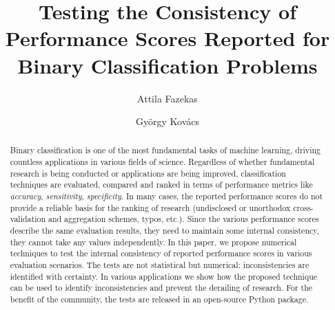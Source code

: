 \documentclass[5p, final]{elsarticle}
\begin{document}
\begin{frontmatter}




\title{Testing the Consistency of Performance Scores Reported for Binary Classification Problems}


\author[1]{Attila Fazekas} 

\author[2]{Gy\"orgy Kov\'acs}



\begin{abstract}
Binary classification is one of the most fundamental tasks of machine learning, driving countless applications in various fields of science. Regardless of whether fundamental research is being conducted or applications are being improved, classification techniques are evaluated, compared and ranked in terms of performance metrics like \emph{accuracy}, \emph{sensitivity}, \emph{specificity}. In many cases, the reported performance scores do not provide a reliable basis for the ranking of research (undisclosed or unorthodox cross-validation and aggregation schemes, typos, etc.). Since the various performance scores describe the same evaluation results, they need to maintain some internal consistency, they cannot take any values independently. In this paper, we propose numerical techniques to test the internal consistency of reported performance scores in various evaluation scenarios. The tests are not statistical but numerical: inconsistencies are identified with certainty. In various applications we show how the proposed technique can be used to identify inconsistencies and prevent the derailing of research. For the benefit of the community, the tests are released in an open-source Python package.


\end{abstract}
\end{frontmatter}
\end{document}
